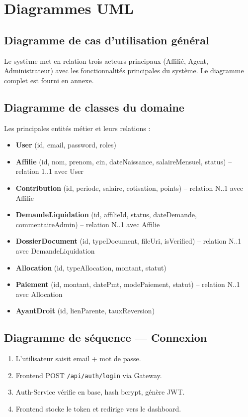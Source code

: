 \documentclass[12pt,a4paper,oneside]{report}
\begin{document}
\section{Diagrammes UML}

\subsection{Diagramme de cas d'utilisation général}
Le système met en relation trois acteurs principaux (Affilié, Agent, Administrateur) avec les fonctionnalités principales du système. Le diagramme complet est fourni en annexe.

\subsection{Diagramme de classes du domaine}
Les principales entités métier et leurs relations :
\begin{itemize}
    \item \textbf{User} (id, email, password, roles)
    \item \textbf{Affilie} (id, nom, prenom, cin, dateNaissance, salaireMensuel, status) -- relation 1..1 avec User
    \item \textbf{Contribution} (id, periode, salaire, cotisation, points) -- relation N..1 avec Affilie
    \item \textbf{DemandeLiquidation} (id, affilieId, status, dateDemande, commentaireAdmin) -- relation N..1 avec Affilie
    \item \textbf{DossierDocument} (id, typeDocument, fileUri, isVerified) -- relation N..1 avec DemandeLiquidation
    \item \textbf{Allocation} (id, typeAllocation, montant, statut)
    \item \textbf{Paiement} (id, montant, datePmt, modePaiement, statut) -- relation N..1 avec Allocation
    \item \textbf{AyantDroit} (id, lienParente, tauxReversion)
\end{itemize}

\subsection{Diagramme de séquence --- Connexion}
\begin{enumerate}
    \item L'utilisateur saisit email + mot de passe.
    \item Frontend POST \texttt{/api/auth/login} via Gateway.
    \item Auth-Service vérifie en base, hash bcrypt, génère JWT.
    \item Frontend stocke le token et redirige vers le dashboard.
\end{enumerate}
\end{document}
